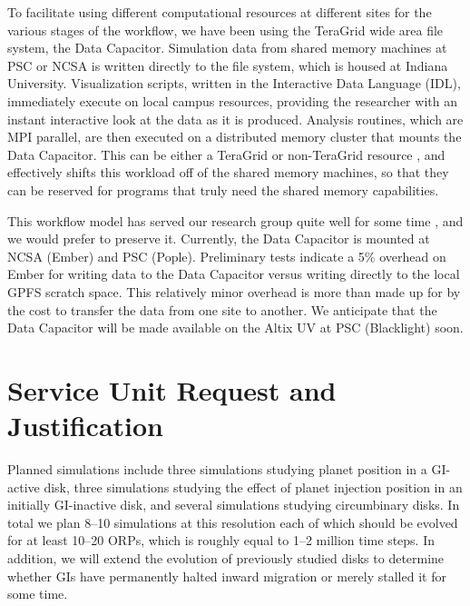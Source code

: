 \documentclass[12pt,preprint2]{aastex}
\begin{document}
To facilitate using different computational resources at different sites for the various stages of the workflow, we have
been using the TeraGrid wide area file system, the Data Capacitor. Simulation data from shared memory machines at PSC or
NCSA is written directly to the file system, which is housed at Indiana University. Visualization scripts, written in
the Interactive Data Language (IDL), immediately execute on local campus resources, providing the researcher with an
instant interactive look at the data as it is produced. Analysis routines, which are MPI parallel, are then executed on
a distributed memory cluster that mounts the Data Capacitor. This can be either a TeraGrid or non-TeraGrid resource
\citep{michael2010b}, and effectively shifts this workload off of the shared memory machines, so that they can be
reserved for programs that truly need the shared memory capabilities.

This workflow model has served our research group quite well for some time \citep{henschel2010,michael2010b}, and we
would prefer to preserve it. Currently, the Data Capacitor is mounted at NCSA (Ember) and PSC (Pople). Preliminary tests
indicate a 5\% overhead on Ember for writing data to the Data Capacitor versus writing directly to the local GPFS
scratch space. This relatively minor overhead is more than made up for by the cost to transfer the data from one site to
another. We anticipate that the Data Capacitor will be made available on the Altix UV at PSC (Blacklight) soon.

\section{Service Unit Request and Justification}
\label{sec:performance}

Planned simulations include three simulations studying planet position in a GI-active disk, three simulations studying the effect of
planet injection position in an initially GI-inactive disk, and several simulations studying circumbinary disks. In
total we plan 8--10 simulations at this resolution each of which should be evolved for at least 10--20 ORPs, which is roughly equal to
1--2 million time steps. In addition, we will extend the evolution of previously studied disks to determine whether GIs
have permanently halted inward migration or merely stalled it for some time.
\end{document}

